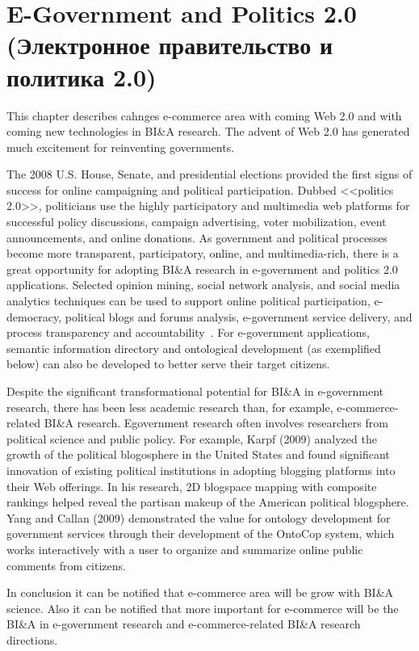\section{E-Government and Politics 2.0 (Электронное правительство и политика 2.0)}

This chapter describes cahnges e-commerce area with coming Web 2.0
and with coming new technologies in BI\&A research. The advent of Web 2.0 has generated much excitement for
reinventing governments. 

The 2008 U.S. House, Senate, and
presidential elections provided the first signs of success for
online campaigning and political participation. Dubbed
<<politics 2.0>>, politicians use the highly participatory and
multimedia web platforms for successful policy discussions,
campaign advertising, voter mobilization, event announcements,
and online donations. As government and political
processes become more transparent, participatory, online, and
multimedia-rich, there is a great opportunity for adopting
BI\&A research in e-government and politics 2.0 applications.
Selected opinion mining, social network analysis, and social
media analytics techniques can be used to support online
political participation, e-democracy, political blogs and
forums analysis, e-government service delivery, and process
transparency and accountability~\cite{Chen:2006}. For e-government applications, semantic information
directory and ontological development (as exemplified below)
can also be developed to better serve their target citizens.

Despite the significant transformational potential for BI\&A in
e-government research, there has been less academic research
than, for example, e-commerce-related BI\&A research. Egovernment
research often involves researchers from political
science and public policy. For example, Karpf (2009) analyzed
the growth of the political blogosphere in the United
States and found significant innovation of existing political
institutions in adopting blogging platforms into their Web
offerings. In his research, 2D blogspace mapping with composite
rankings helped reveal the partisan makeup of the
American political blogsphere. Yang and Callan (2009)
demonstrated the value for ontology development for government
services through their development of the OntoCop
system, which works interactively with a user to organize and
summarize online public comments from citizens.

In conclusion it can be notified that e-commerce area will be grow with BI\&A science. Also it can be notified that more important for e-commerce will be the BI\&A in e-government research and e-commerce-related BI\&A research directions.